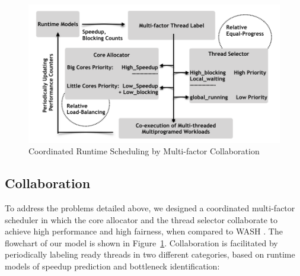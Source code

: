 
\begin{figure}
\centering
\includegraphics[scale=0.5]{figures/COLAB_M.pdf}
\caption{Coordinated Runtime Scheduling by Multi-factor Collaboration}
\label{figure:f2}
\end{figure} 

\subsection{Collaboration}
To address the problems detailed above, we designed a coordinated multi-factor scheduler in which the core allocator and the thread selector collaborate to achieve high performance and high fairness, when compared to %
WASH \cite{jibaja2016portable}.
The flowchart of our model is shown in Figure~\ref{figure:f2}. 
Collaboration is facilitated by periodically labeling ready threads in two different categories, based on runtime models of speedup prediction and bottleneck identification: 

